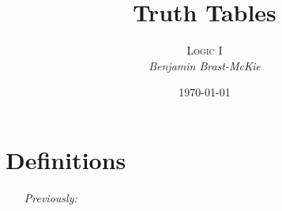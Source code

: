 \title{\textbf{Truth Tables}} %

\author{\textsc{Logic I}\\ \em Benjamin Brast-McKie} %

\date{\today} %




\maketitle %

\thispagestyle{empty}



\section*{Definitions}

\begin{enumerate}[leftmargin=1.5in,labelsep=.15in] %
  \item[\it Previously:] 
\end{enumerate}







